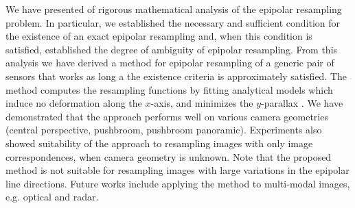 \documentclass{ipol}
\begin{document}
{We have presented of rigorous mathematical analysis of the epipolar resampling problem. In particular, we  established the necessary and sufficient condition for the existence of an exact epipolar resampling and, when this condition is satisfied, established the degree of ambiguity of epipolar resampling. From this analysis we have derived a method for epipolar resampling of a generic pair of sensors that works as long a the existence criteria is approximately satisfied. The method computes the resampling functions by fitting  analytical models which induce no deformation along the $x$-axis, and minimizes the $y$-parallax .} We have demonstrated that the approach performs well on various camera geometries (central perspective, pushbroom, pushbroom panoramic). Experiments also showed suitability of the approach to resampling images with only image correspondences, when camera geometry is unknown. Note that the proposed method is not suitable for resampling images with large variations in the epipolar line directions. Future works include applying the method to multi-modal images, e.g. optical and radar.
%
%
%
\end{document}
